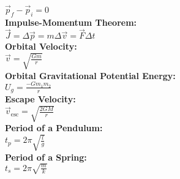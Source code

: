 \documentclass[12pt]{article}
\begin{document}
    \\ \( \vec{ p }_f - \vec{ p }_i = 0 \)
\\ \textbf{Impulse-Momentum Theorem:}
    \\ \( \vec{ J } = \Delta \vec{ p } = m \Delta \vec{ v } = \vec{ F } \Delta t \)
\\ \textbf{Orbital Velocity:}
    \\ \( \vec{ v } = \sqrt{ \displaystyle\frac{ Gm }{ r } } \)
\\ \textbf{Orbital Gravitational Potential Energy:}
    \\ \( U_g = \displaystyle\frac{ -G m_1 m_2 }{ r } \)
\\ \textbf{Escape Velocity:}
    \\ \( \vec{ v }_{\text{esc}} = \sqrt{ \displaystyle\frac{ 2GM }{ r } } \)
\\ \textbf{Period of a Pendulum:}
    \\ \( t_p = 2 \pi \sqrt{ \displaystyle\frac{ l }{ g } } \)
\\ \textbf{Period of a Spring:}
    \\ \( t_s = 2 \pi \sqrt{ \displaystyle\frac{ m }{ k } } \)
\end{document}
